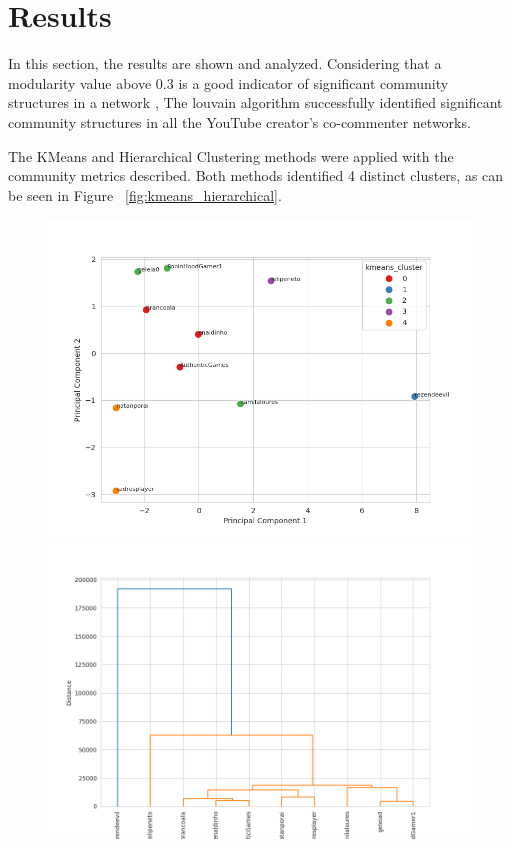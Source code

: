 \documentclass[12pt]{article}
\begin{document}
\section{Results}

In this section, the results are shown and analyzed.
Considering that a modularity value above 0.3 is a good indicator of significant
community structures in a network \cite{PhysRevE.70.066111}, The louvain algorithm successfully 
identified significant community structures in all the YouTube creator's co-commenter networks.

The KMeans and Hierarchical Clustering methods were applied with the community metrics described. 
Both methods identified 4 distinct clusters, as can be seen in Figure ~\ref{fig:kmeans_hierarchical}.

\begin{figure}[ht]
    \centering
    \begin{minipage}{0.44\textwidth}
        \centering
        \includegraphics[keepaspectratio,width=\textwidth]{./imgs/KMeans_PCA.png}
    \end{minipage}%
    \hspace{0.0001\textwidth} 
    \begin{minipage}{0.45\textwidth}
        \centering
        \includegraphics[keepaspectratio,width=\textwidth]{./imgs/Hierarchical_clustering.png}

\end{minipage}
\end{figure}
\end{document}

